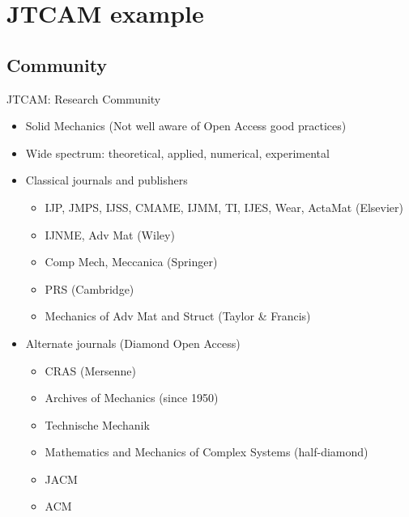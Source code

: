 \documentclass[10pt,compress,serif,aspectratio=169]{beamer}
\begin{document}

\section{JTCAM example}
\subsection{Community}

\begin{frame}[t]{JTCAM: Research Community}
\begin{itemize}
 \item Solid Mechanics (Not well aware of Open Access good practices)
 \item Wide spectrum: theoretical, applied, numerical, experimental
 \item Classical journals and publishers
 \begin{itemize}
 \item IJP, JMPS, IJSS, CMAME, IJMM, TI, IJES, Wear, ActaMat (Elsevier)
 \item IJNME, Adv Mat (Wiley)
 \item Comp Mech, Meccanica (Springer)
 \item PRS (Cambridge)
 \item Mechanics of Adv Mat and Struct (Taylor \& Francis)
 \end{itemize}
 \item Alternate journals (Diamond Open Access)
  \begin{itemize}
 \item CRAS (Mersenne)
 \item Archives of Mechanics (since 1950)
 \item Technische Mechanik
 \item Mathematics and Mechanics of Complex Systems (half-diamond)
 \item JACM
 \item ACM
 \end{itemize}
\end{itemize}

\end{frame}

\end{document}
